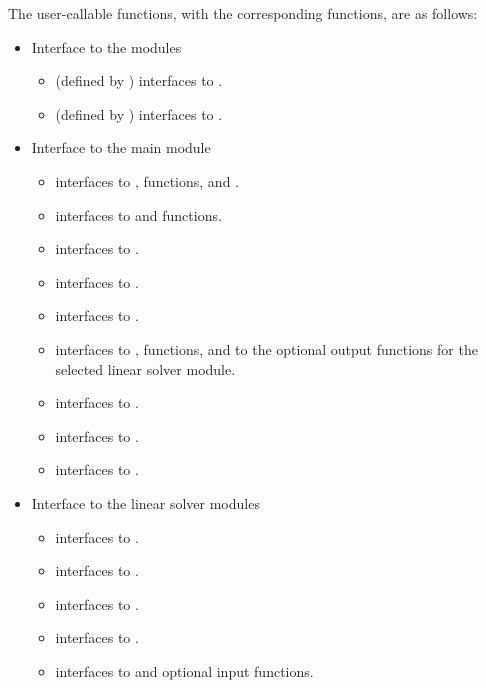 The user-callable functions, with the corresponding {\ida} functions,
are as follows:
\begin{itemize}
\item
  Interface to the {\nvector} modules
  \begin{itemize}
  \item {} (defined by {\nvecs}) 
    interfaces to .
  \item {} (defined by {\nvecp}) 
    interfaces to .
  \end{itemize}
\item Interface to the main {\ida} module
  \begin{itemize}
  \item {}
    interfaces to ,  functions, and .
  \item {}
    interfaces to  and  functions.
  \item {}
    interfaces to .
  \item {}
    interfaces to .
  \item {}
    interfaces to .
  \item {}
    interfaces to ,  functions, and to the optional
    output functions for the selected linear solver module.
  \item {}
    interfaces to .
  \item {}
    interfaces to .
  \item {}    
    interfaces to .
  \end{itemize}
\item Interface to the linear solver modules
  \begin{itemize}
  \item {}
    interfaces to .
  \item {}
    interfaces to .
  \item {}
    interfaces to .
  \item {}
    interfaces to .
  \item {}
    interfaces to  and {\spgmr} optional input functions.

\end{itemize}
\end{itemize}
